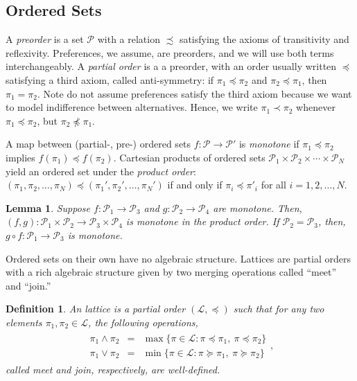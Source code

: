 \documentclass[conference]{ieeeconf}
\renewcommand{\P}{\mathcal{P}}
\renewcommand{\L}{\mathcal{L}}
\newcommand{\join}{\vee}
\newcommand{\meet}{\wedge}
\newtheorem{lemma}{Lemma}
\newtheorem{definition}{Definition}
\begin{document}
\subsection{Ordered Sets}

A \emph{preorder} is a set $\P$ with a relation $\precsim$ satisfying the axioms of transitivity and reflexivity. Preferences, we assume, are preorders, and we will use both terms interchangeably. A \emph{partial order} is a a preorder, with an order usually written $\preceq$ satisfying a third axiom, called anti-symmetry: if $\pi_1 \preceq \pi_2$ and $\pi_2 \preceq \pi_1$, then $\pi_1 = \pi_2$. Note do not assume preferences satisfy the third axiom because we want to model indifference between alternatives. Hence, we write $\pi_1 \prec \pi_2$ whenever $\pi_1 \preceq \pi_2$, but $\pi_2 \not \preceq \pi_1$.

A map between (partial-, pre-) ordered sets $f: \P \to \P'$ is \emph{monotone} if $\pi_1 \preceq \pi_2$ implies $f(\pi_1) \preceq f(\pi_2)$. Cartesian products of ordered sets $\P_1 \times \P_2 \times \cdots \times \P_N$ yield an ordered set under the \emph{product order}: $(\pi_1, \pi_2, \dots, \pi_N) \preceq (\pi_1', \pi_2', \dots, \pi_N')$ if and only if $\pi_i \preceq \pi'_i$ for all $i = 1,2,\dots, N$.

\begin{lemma} \label{lem:compose-produt}
    Suppose $f: \P_1 \to \P_3$ and $g: \P_2 \to \P_4$ are monotone.  Then, $(f,g): \P_1 \times \P_2 \to \P_3 \times \P_4$ is monotone in the product order. If $\P_2 = \P_3$, then, $g \circ f: \P_1 \to \P_3$ is monotone.
\end{lemma}

Ordered sets on their own have no algebraic structure. Lattices are partial orders with a rich algebraic structure given by two merging operations called ``meet'' and ``join.''
 
\begin{definition} \label{def:lattice}
    An \emph{lattice} is a partial order $(\L, \preceq)$ such that for any two elements $\pi_1, \pi_2 \in \L$, the following operations,
    \begin{align*}
        \begin{aligned}
        \pi_1 \meet \pi_2 &=& \max\{ \pi \in \L: \pi \preceq \pi_1,~\pi \preceq \pi_2 \} \\
        \pi_1 \join \pi_2 &=& \min\{ \pi \in \L: \pi \succeq \pi_1,~\pi \succeq \pi_2 \}        
        \end{aligned},
    \end{align*}
    called \emph{meet} and \emph{join}, respectively, are well-defined. 
\end{definition}
\end{document}
